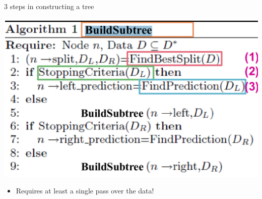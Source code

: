 

\begin{frame}{3 steps in constructing a tree}
    \begin{center}
        \includegraphics[width=0.85\linewidth]{images/decision-trees/decision-trees-9.png}
    \end{center}

    \vspace{0.3cm}
    \begin{itemize}
        \item Requires at least a single pass over the data!
    \end{itemize}
\end{frame}


